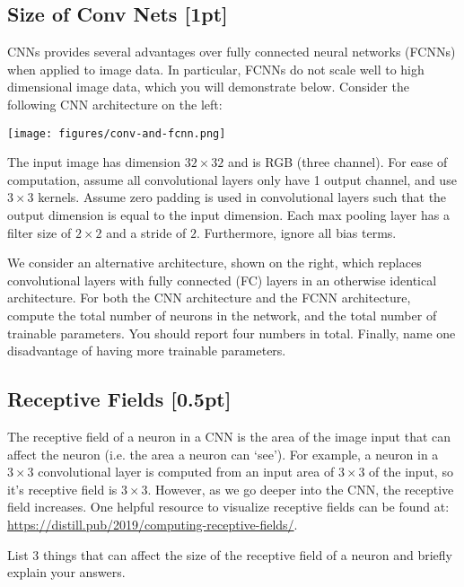 \subsection{Size of Conv Nets {\color{blue}[1pt] \LIII}}
CNNs provides several advantages over fully connected neural networks (FCNNs) when applied to image data. In particular, FCNNs do not scale well to high dimensional image data, which you will demonstrate below. Consider the following CNN architecture on the left:
\vspace{1em}
\begin{center}
    \texttt{[image: figures/conv-and-fcnn.png]}
\end{center}
\vspace{-1em}
The input image has dimension $32 \times 32$ and is RGB (three channel). For ease of computation, assume all convolutional layers only have 1 output channel, and use $3 \times 3$ kernels. Assume zero padding is used in convolutional layers such that the output dimension is equal to the input dimension. Each max pooling layer has a filter size of $2 \times 2$ and a stride of $2$. Furthermore, ignore all bias terms.

We consider an alternative architecture, shown on the right, which replaces convolutional layers with fully connected (FC) layers in an otherwise identical architecture. For both the CNN architecture and the FCNN architecture, compute the total number of neurons in the network, and the total number of trainable parameters. You should report four numbers in total. Finally, name one disadvantage of having more trainable parameters.

\subsection{Receptive Fields {\color{blue}[0.5pt] \LI}}
The receptive field of a neuron in a CNN is the area of the image input that can affect the neuron (i.e. the area a neuron can `see'). For example, a neuron in a $3 \times 3$ convolutional layer is computed from an input area of $3\times 3$ of the input, so it's receptive field is $3\times 3$. However, as we go deeper into the CNN, the receptive field increases.  One helpful resource to visualize receptive fields can be found at: \url{https://distill.pub/2019/computing-receptive-fields/}. 

List 3 things that can affect the size of the receptive field of a neuron and briefly explain your answers.


